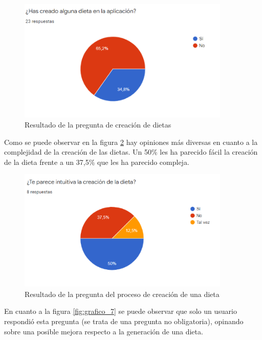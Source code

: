 \begin{figure}[H]
    \centering
    \includegraphics[width=0.9\textwidth]{Images/Capitulo8/Capitulo8.2/grafico5.png}
    \caption{Resultado de la pregunta de creación de dietas}
    \label{fig:grafico_5}
\end{figure}


Como se puede observar en la figura \ref{fig:grafico_6} hay opiniones más diversas en cuanto a la complejidad de la creación de las dietas. Un 50\% les ha parecido fácil la creación de la dieta frente a un 37,5\% que les ha parecido compleja.

\begin{figure}[H]
    \centering
    \includegraphics[width=0.9\textwidth]{Images/Capitulo8/Capitulo8.2/grafico6.png}
    \caption{Resultado de la pregunta del proceso de creación de una dieta}
    \label{fig:grafico_6}
\end{figure}

En cuanto a la figura \ref{fig:grafico_7} se puede observar que solo un usuario respondió esta pregunta (se trata de una pregunta no obligatoria), opinando sobre una posible mejora respecto a la generación de una dieta.

